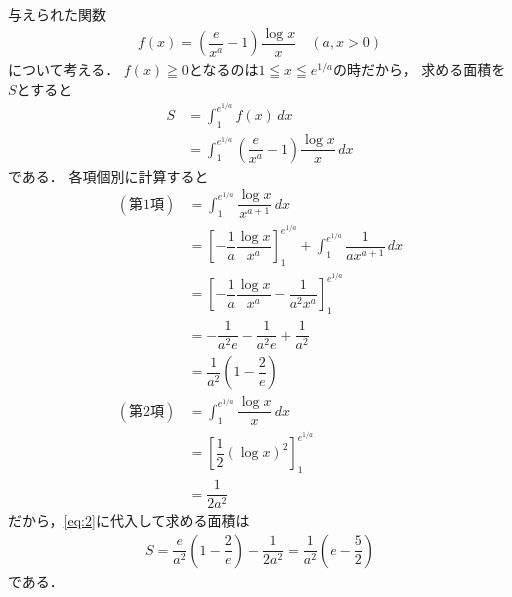\documentclass[../../main.tex]{subfiles}
\begin{document}
与えられた関数
\begin{align}
  f(x)=\left(\dfrac{e}{x^a}-1\right)\dfrac{\log x}{x} \quad (a,x > 0) \label{eq:1}
\end{align}
について考える．
$f(x)\geqq0$となるのは$1\leqq x\leqq e^{1/a}$の時だから，
求める面積を$S$とすると
\begin{align}
  S
  & =\int_1^{e^{1/a}}f(x)\,dx  \\
  & =\int_1^{e^{1/a}}\left(\dfrac{e}{x^a}-1\right)\dfrac{\log x}{x} \,dx  \label{eq:2}
\end{align}
である．
各項個別に計算すると
\begin{align}
  (\text{第1項})
  &=\int_1^{e^{1/a}}\dfrac{\log x}{x^{a+1}}\,dx \\
  &=\left[-\dfrac{1}{a}\dfrac{\log x}{x^a}\right]_1^{e^{1/a}}
  +\int_1^{e^{1/a}}\dfrac{1}{a x^{a+1}}\,dx\\
  &=\left[-\dfrac{1}{a}\dfrac{\log x}{x^a}-\dfrac{1}{a^2 x^a}\right]_1^{e^{1/a}}\\
  &=-\dfrac{1}{a^2 e}-\dfrac{1}{a^2 e}+\dfrac{1}{a^2} \\
  &=\dfrac{1}{a^2}\left(1-\dfrac{2}{e}\right) \\
  (\text{第2項})
  &=\int_1^{e^{1/a}}\dfrac{\log x}{x}\,dx \\
  &=\left[\dfrac{1}{2}(\log x)^2\right]_1^{e^{1/a}} \\
  &=\dfrac{1}{2a^2}
\end{align}
だから，\cref{eq:2}に代入して求める面積は
\begin{align}
  S
  =\dfrac{e}{a^2}\left(1-\dfrac{2}{e}\right)-\dfrac{1}{2a^2}
  =\dfrac{1}{a^2}\left(e-\dfrac{5}{2}\right)
\end{align}
である．
\end{document}
